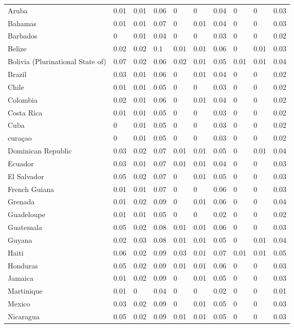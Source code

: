 \begin{longtable}[t]{llllllllll}
Aruba & 0.01 & 0.01 & 0.06 & 0 & 0 & 0.04 & 0 & 0 & 0.03\\
Bahamas & 0.01 & 0.01 & 0.07 & 0 & 0.01 & 0.04 & 0 & 0 & 0.03\\
Barbados & 0 & 0.01 & 0.04 & 0 & 0 & 0.03 & 0 & 0 & 0.02\\
Belize & 0.02 & 0.02 & 0.1 & 0.01 & 0.01 & 0.06 & 0 & 0.01 & 0.03\\
Bolivia (Plurinational State of) & 0.07 & 0.02 & 0.06 & 0.02 & 0.01 & 0.05 & 0.01 & 0.01 & 0.04\\
Brazil & 0.03 & 0.01 & 0.06 & 0 & 0.01 & 0.04 & 0 & 0 & 0.02\\
Chile & 0.01 & 0.01 & 0.05 & 0 & 0 & 0.03 & 0 & 0 & 0.02\\
Colombia & 0.02 & 0.01 & 0.06 & 0 & 0.01 & 0.04 & 0 & 0 & 0.02\\
Costa Rica & 0.01 & 0.01 & 0.05 & 0 & 0 & 0.03 & 0 & 0 & 0.02\\
Cuba & 0 & 0.01 & 0.05 & 0 & 0 & 0.03 & 0 & 0 & 0.02\\
curaçao & 0 & 0.01 & 0.05 & 0 & 0 & 0.03 & 0 & 0 & 0.02\\
Dominican Republic & 0.03 & 0.02 & 0.07 & 0.01 & 0.01 & 0.05 & 0 & 0.01 & 0.04\\
Ecuador & 0.03 & 0.01 & 0.07 & 0.01 & 0.01 & 0.04 & 0 & 0 & 0.03\\
El Salvador & 0.05 & 0.02 & 0.07 & 0 & 0.01 & 0.05 & 0 & 0 & 0.03\\
French Guiana & 0.01 & 0.01 & 0.07 & 0 & 0 & 0.06 & 0 & 0 & 0.03\\
Grenada & 0.01 & 0.02 & 0.09 & 0 & 0.01 & 0.06 & 0 & 0 & 0.04\\
Guadeloupe & 0.01 & 0.01 & 0.05 & 0 & 0 & 0.02 & 0 & 0 & 0.02\\
Guatemala & 0.05 & 0.02 & 0.08 & 0.01 & 0.01 & 0.06 & 0 & 0 & 0.03\\
Guyana & 0.02 & 0.03 & 0.08 & 0.01 & 0.01 & 0.05 & 0 & 0.01 & 0.04\\
Haiti & 0.06 & 0.02 & 0.09 & 0.03 & 0.01 & 0.07 & 0.01 & 0.01 & 0.05\\
Honduras & 0.05 & 0.02 & 0.09 & 0.01 & 0.01 & 0.06 & 0 & 0 & 0.03\\
Jamaica & 0.01 & 0.02 & 0.09 & 0 & 0.01 & 0.05 & 0 & 0 & 0.03\\
Martinique & 0.01 & 0 & 0.04 & 0 & 0 & 0.02 & 0 & 0 & 0.01\\
Mexico & 0.03 & 0.02 & 0.09 & 0 & 0.01 & 0.05 & 0 & 0 & 0.03\\
Nicaragua & 0.05 & 0.02 & 0.09 & 0.01 & 0.01 & 0.05 & 0 & 0 & 0.03\\

\end{longtable}
